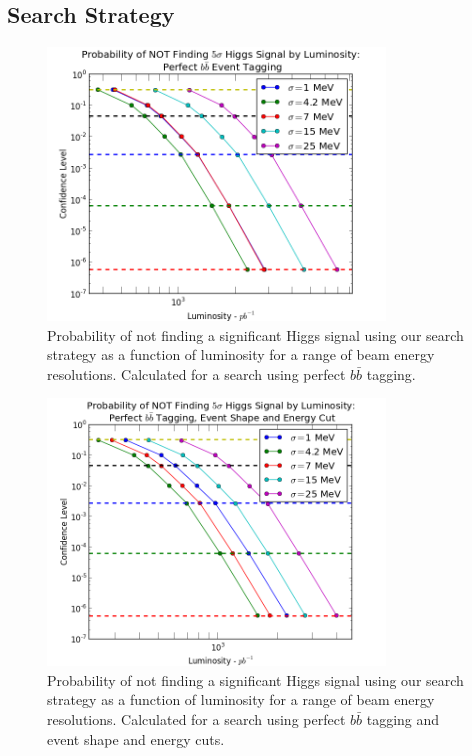 \documentclass[a4paper]{article}
\begin{document}
\subsection{Search Strategy}
\label{sec:lum-needed}

\begin{figure}[H]
		\includegraphics[width=0.8\textwidth]{lum-needed-bbar-raw}
		\caption{Probability of not finding a significant Higgs signal using our search strategy as a function of luminosity for a range of beam energy resolutions. Calculated for a search using perfect $b\bar{b}$ tagging.\label{fig:lum-needed-bbar-raw}}
	\end{figure}

	\begin{figure}[H]
		\includegraphics[width=0.8\textwidth]{lum-needed-bbar-cut}
		\caption{Probability of not finding a significant Higgs signal using our search strategy as a function of luminosity for a range of beam energy resolutions. Calculated for a search using perfect $b\bar{b}$ tagging and event shape and energy cuts.\label{fig:lum-needed-bbar-cut}}
	\end{figure}
\end{document}
